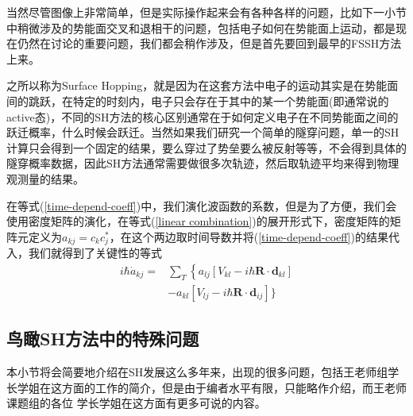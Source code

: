 \documentclass{article}
\numberwithin{equation}{section}
\begin{document}
        当然尽管图像上非常简单，但是实际操作起来会有各种各样的问题，比如下一小节中稍微涉及的势能面交叉和退相干的问题，包括电子如何在势能面上运动，都是现在仍然在讨论的重要问题，我们都会稍作涉及，但是首先要回到最早的FSSH方法上来。

        之所以称为Surface Hopping，就是因为在这套方法中电子的运动其实是在势能面间的跳跃，在特定的时刻内，电子只会存在于其中的某一个势能面(即通常说的active态)，不同的SH方法的核心区别通常在于如何定义电子在不同势能面之间的跃迁概率，什么时候会跃迁。当然如果我们研究一个简单的隧穿问题，单一的SH计算只会得到一个固定的结果，要么穿过了势垒要么被反射等等，不会得到具体的隧穿概率数据，因此SH方法通常需要做很多次轨迹，然后取轨迹平均来得到物理观测量的结果。

        在等式(\ref{time-depend-coeff})中，我们演化波函数的系数，但是为了方便，我们会使用密度矩阵的演化，在等式(\ref{linear combination})的展开形式下，密度矩阵的矩阵元定义为$a_{kj}=c_k c_j^*$，在这个两边取时间导数并将(\ref{time-depend-coeff})的结果代入，我们就得到了关键性的等式
        \begin{equation}
          \begin{aligned} i \hbar \dot{a}_{k j}=& \sum_{T}\left\{a_{l j}\left[V_{k l}-i \hbar \mathbf{R} \cdot \mathbf{d}_{k l}\right]\right.\\ &-a_{k l}\left[V_{l j}-i \hbar \mathbf{R} \cdot \mathbf{d}_{i j}\right] \} \end{aligned}
          \label{time-de DM}
        \end{equation}
        
      \subsection{鸟瞰SH方法中的特殊问题}
        本小节将会简要地介绍在SH发展这么多年来，出现的很多问题，包括王老师组学长学姐在这方面的工作的简介，但是由于编者水平有限，只能略作介绍，而王老师课题组的各位
        学长学姐在这方面有更多可说的内容。
  
\end{document}
